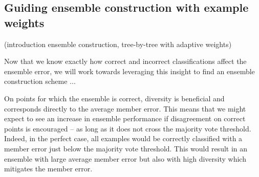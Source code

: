 \documentclass[../main.tex]{subfiles}
\begin{document}






\subsection{Guiding ensemble construction with example weights}
\label{sec:guiding-ensemble-construction-with-example-weights}

(introduction ensemble construction, tree-by-tree with adaptive weights)

Now that we know exactly how correct and incorrect classifications affect the ensemble error, we will work towards leveraging this insight to find an ensemble construction scheme ...


On points for which the ensemble is correct, diversity is beneficial and corresponds directly to the average member error. This means that we might expect to see an increase in ensemble performance if disagreement on correct points is encouraged -- as long as it does not cross the majority vote threshold. Indeed, in the perfect case, all examples would be correctly classified with a member error just below the majority vote threshold. This would result in an ensemble with large average member error but also with high diversity which mitigates the member error.

\end{document}
